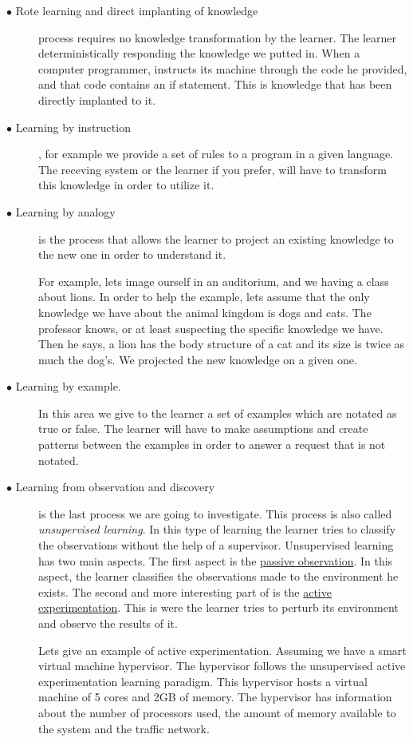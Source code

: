 \begin{description}
	\item[$\bullet$ Rote learning and direct implanting of knowledge] process requires no knowledge transformation by the learner. The learner deterministically responding the knowledge we putted in. When a computer programmer, instructs its machine through the code he provided, and that code contains an if statement. This is knowledge that has been directly implanted to it.
	\item[$\bullet$ Learning by instruction], for example we provide a set of rules to a program in a given language. The receving system or the learner if you prefer, will have to transform this knowledge in order to utilize it.
	\item[$\bullet$ Learning by analogy] is the process that allows the learner to project an existing knowledge to the new one in order to understand it.
	
	
	For example, lets image ourself in an auditorium, and we having a class about lions. In order to help the example, lets assume that the only knowledge we have about the animal kingdom is dogs and cats. The professor knows, or at least suspecting the specific knowledge we have. Then he says, a lion has the body structure of a cat and its size is twice as much the dog's. We projected the new knowledge on a given one.
	
	\item[$\bullet$ Learning by example.] In this area we give to the learner a set of examples which are notated as true or false. The learner will have to make assumptions and create patterns between the examples in order to answer a request that is not notated.
	
	\item[$\bullet$ Learning from observation and discovery] is the last process we are going to investigate. This process is also called \textit{unsupervised learning}.
	In this type of learning the learner tries to classify the observations without the help of a supervisor. Unsupervised learning has two main aspects. The first aspect is the \underline{passive observation}. In this aspect, the learner classifies the observations made to the environment he exists. The second and more interesting part of is the \underline{active experimentation}. This is were the learner tries to perturb its environment and observe the results of it. 
	
	Lets give an example of active experimentation. Assuming we have a smart virtual machine hypervisor. The hypervisor follows the unsupervised active experimentation learning paradigm. This hypervisor hosts a virtual machine of 5 cores and 2GB of memory. The hypervisor has information about the number of processors used, the amount of memory available to the system and the traffic network.
	

\end{description}
